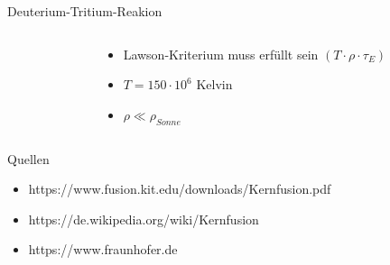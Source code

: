 \documentclass[aspectratio=169,xcolor=dvipsnames,14pt]{beamer}
\begin{document}
    \begin{frame}{Deuterium-Tritium-Reakion}
        \begin{columns}
            
            \begin{column}{0.7\textwidth}
                
            \end{column}

            \begin{column}{0.3\textwidth}
                \begin{itemize}
                \color{LightGrey}
                    \item Lawson-Kriterium muss erfüllt sein $(T\cdot\rho\cdot\tau _{E})$
                    \item $T = 150\cdot{10}^{6}$ Kelvin
                    \item $\rho \ll \rho_{Sonne}$
                \end{itemize}
            \end{column}

        \end{columns}
    \end{frame}

\begin{frame}{Quellen}
\begin{itemize}
    \color{LightGrey}
\item https://www.fusion.kit.edu/downloads/Kernfusion.pdf
\item https://de.wikipedia.org/wiki/Kernfusion
\item https://www.fraunhofer.de
\end{itemize}
\end{frame}
\end{document}
